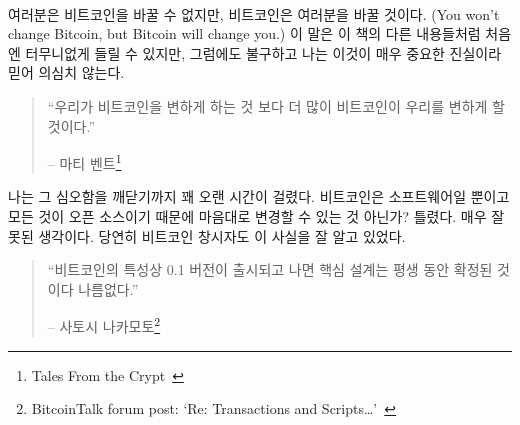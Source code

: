 \paragraph{}
여러분은 비트코인을 바꿀 수 없지만, 비트코인은 여러분을 바꿀 것이다.
(You won't change Bitcoin, but Bitcoin will change you.)
이 말은 이 책의 다른 내용들처럼 처음엔 터무니없게 들릴 수 있지만,
그럼에도 불구하고 나는 이것이 매우 중요한 진실이라 믿어 의심치 않는다. 

\begin{quotation}\begin{samepage}
		\enquote{우리가 비트코인을 변하게 하는 것 보다 더 많이 비트코인이 우리를 변하게 할 것이다.}
		\begin{flushright} -- 마티 벤트\footnote{Tales From the Crypt~\cite{tftc21}}
\end{flushright}\end{samepage}\end{quotation}

나는 그 심오함을 깨닫기까지 꽤 오랜 시간이 걸렸다.
비트코인은 소프트웨어일 뿐이고 모든 것이 오픈 소스이기 때문에 마음대로 변경할 수 있는 것 아닌가? 
틀렸다. 매우 잘못된 생각이다. 
당연히 비트코인 창시자도 이 사실을 잘 알고 있었다.

\begin{quotation}\begin{samepage}
		\enquote{비트코인의 특성상 0.1 버전이 출시되고 나면 핵심 설계는 평생 동안 확정된 것이다 나름없다.}
		\begin{flushright} -- 사토시 나카모토\footnote{BitcoinTalk forum post: `Re:
				Transactions and Scripts\ldots'~\cite{satoshi-set-in-stone}}
\end{flushright}\end{samepage}\end{quotation}

